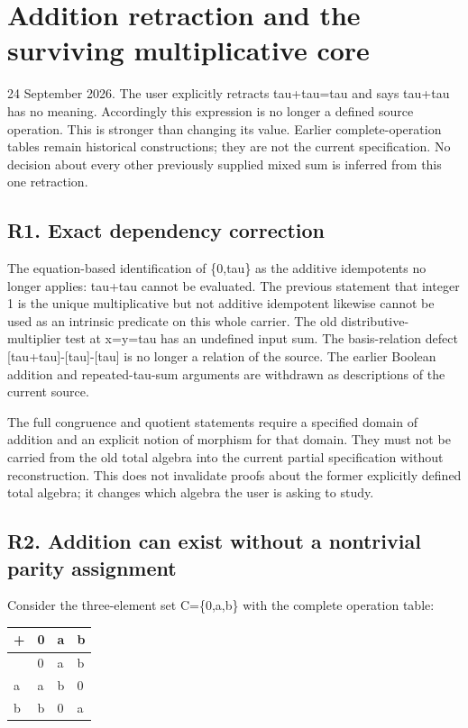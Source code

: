 \documentclass[
]{article}
\author{}
\date{}
\newcounter{none} %
\begin{document}
\section{Addition retraction and the surviving multiplicative
core}\label{addition-retraction-and-the-surviving-multiplicative-core}

24 September 2026. The user explicitly retracts tau+tau=tau and says
tau+tau has no meaning. Accordingly this expression is no longer a
defined source operation. This is stronger than changing its value.
Earlier complete-operation tables remain historical constructions; they
are not the current specification. No decision about every other
previously supplied mixed sum is inferred from this one retraction.

\subsection{R1. Exact dependency
correction}\label{r1.-exact-dependency-correction}

The equation-based identification of \{0,tau\} as the additive
idempotents no longer applies: tau+tau cannot be evaluated. The previous
statement that integer 1 is the unique multiplicative but not additive
idempotent likewise cannot be used as an intrinsic predicate on this
whole carrier. The old distributive-multiplier test at x=y=tau has an
undefined input sum. The basis-relation defect
{[}tau+tau{]}-{[}tau{]}-{[}tau{]} is no longer a relation of the source.
The earlier Boolean addition and repeated-tau-sum arguments are
withdrawn as descriptions of the current source.

The full congruence and quotient statements require a specified domain
of addition and an explicit notion of morphism for that domain. They
must not be carried from the old total algebra into the current partial
specification without reconstruction. This does not invalidate proofs
about the former explicitly defined total algebra; it changes which
algebra the user is asking to study.

\subsection{R2. Addition can exist without a nontrivial parity
assignment}\label{r2.-addition-can-exist-without-a-nontrivial-parity-assignment}

Consider the three-element set C=\{0,a,b\} with the complete operation
table:

{\def\LTcaptype{none} %
\begin{longtable}[]{@{}llll@{}}
\toprule\noalign{}
+ & 0 & a & b \\
\midrule\noalign{}
\endhead
\bottomrule\noalign{}
\endlastfoot
0 & 0 & a & b \\
a & a & b & 0 \\
b & b & 0 & a \\
\end{longtable}
}
\end{document}
